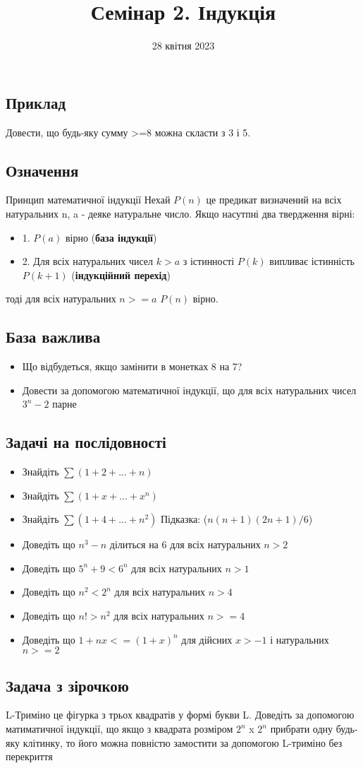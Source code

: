 \documentclass{article}
\begin{document}
\title{Семінар 2. Індукція}
\date{28 квітня 2023}

\maketitle

\subsection*{Приклад}
Довести, що будь-яку сумму >=8 можна скласти з 3 і 5.
\subsection*{Означення}
Принцип математичної індукції
Нехай $P(n)$ це предикат визначений на всіх натуральних n, a - деяке натуральне число. Якщо насутпні два твердження вірні:
\begin{itemize}
    \item 1. $P(a)$ вірно (\textbf{база індукції})
    \item 2. Для всіх натуральних чисел $k > a$ з істинності $P(k)$ випливає істинність $P(k+1)$ (\textbf{індукційний перехід})
\end{itemize}
тоді для всіх натуральних $n >= a$ $P(n)$ вірно.
\subsection*{База важлива}
\begin{itemize}
    \item Що відбудеться, якщо замінити в монетках 8 на 7?
    \item Довести за допомогою математичної індукції, що для всіх натуральних чисел $3^n - 2$ парне
\end{itemize}
\subsection*{Задачі на послідовності}
\begin{itemize}
    \item Знайдіть $\sum (1 + 2 +... + n)$
    \item Знайдіть $\sum (1 + x + ... + x^n)$
    \item Знайдіть $\sum (1 + 4 +... + n^2)$ Підказка: ($n(n+1)(2n+1)/6$)
    \item Доведіть що $n^3 - n$ ділиться на 6 для всіх натуральних $n>2$
    \item Доведіть що $5^n + 9 < 6^n$ для всіх натуральних $n>1$
    \item Доведіть що $n^2 < 2^n$ для всіх натуральних $n > 4$
    \item Доведіть що $n! > n^2$ для всіх натуральних $n >= 4$
    \item Доведіть що $1 + nx <= (1 + x)^n$ для дійсних $x>-1$ і натуральних $n>=2$
\end{itemize}
\subsection*{Задача з зірочкою}
L-Триміно це фігурка з трьох квадратів у формі букви L. Доведіть за допомогою матиматичної індукції, що якщо з квадрата
розміром $2^n$ x $2^n$ прибрати одну будь-яку клітинку, то його можна повністю замостити за допомогою L-триміно без перекриття
\end{document}
